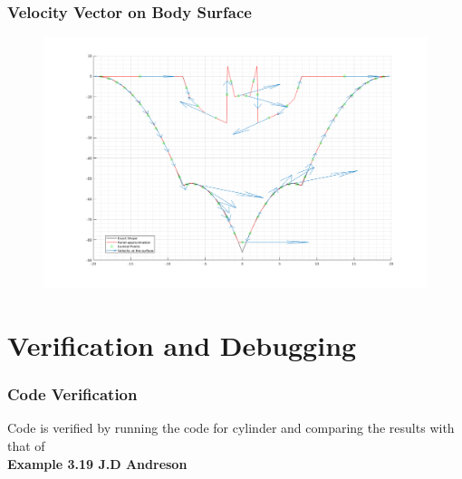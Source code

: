 \documentclass{article}
\begin{document}
\subsubsection{Velocity Vector on Body Surface}
\vspace{-5mm}
    \begin{figure}[htb]
    \centering  
      \includegraphics[width=0.8    \textwidth]{assets/velocity_field.png}
       \centering
    \end{figure}
  
\section{Verification and Debugging}

\subsubsection{Code Verification}

Code is verified by running the code for cylinder and comparing the results with that of \\  \textbf{Example 3.19 J.D Andreson}
\end{document}
